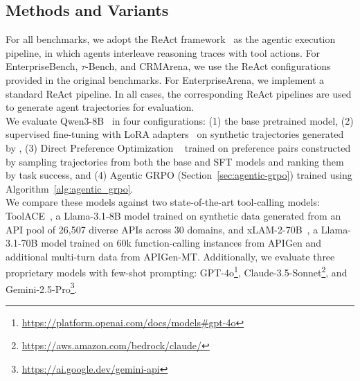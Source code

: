 \documentclass{article}
\theoremstyle{plain}
\theoremstyle{definition}
\theoremstyle{remark}
\begin{document}
\subsection{Methods and Variants}
\label{sec:methods}
\vspace{-0.2cm}
For all benchmarks, we adopt the ReAct framework~\cite{yao2022react} as the agentic execution pipeline, in which agents interleave reasoning traces with tool actions. For EnterpriseBench, $\tau$-Bench, and CRMArena, we use the ReAct configurations provided in the original benchmarks. For EnterpriseArena, we implement a standard ReAct pipeline. In all cases, the corresponding ReAct pipelines are used to generate agent trajectories for evaluation.
\\
\noindent We evaluate Qwen3-8B~\cite{yang2025qwen3} in four configurations:
(1) the base pretrained model,  
(2) supervised fine-tuning with LoRA adapters~\cite{hu2022lora} on synthetic trajectories generated by \name{},  
(3) Direct Preference Optimization ~\cite{rafailov2023direct} trained on preference pairs constructed by sampling trajectories from both the base and SFT models and ranking them by task success, and  
(4) Agentic GRPO (Section~\ref{sec:agentic-grpo}) trained using Algorithm~\ref{alg:agentic_grpo}.
\\
\noindent We compare these models against two state-of-the-art tool-calling models: ToolACE~\cite{liutoolace}, a Llama-3.1-8B model trained on synthetic data generated from an API pool of 26,507 diverse APIs across 30 domains, and xLAM-2-70B~\cite{prabhakar2025apigen}, a Llama-3.1-70B model trained on 60k function-calling instances from APIGen and additional multi-turn data from APIGen-MT. Additionally, we evaluate three proprietary models with few-shot prompting: GPT-4o\footnote{\label{gpt4o}\url{https://platform.openai.com/docs/models\#gpt-4o}}, Claude-3.5-Sonnet\footnote{\label{claude}\url{https://aws.amazon.com/bedrock/claude/}}, and Gemini-2.5-Pro\footnote{\label{gemini}\url{https://ai.google.dev/gemini-api}}.


\vspace{-0.2cm}
\end{document}
